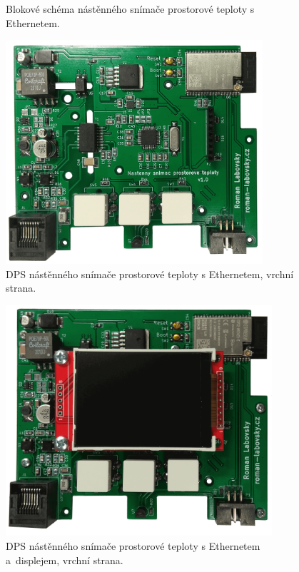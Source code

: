 \begin{figure}[H]
    \centering
    \def\svgwidth{\columnwidth}
    
    \caption[]{Blokové schéma nástěnného snímače prostorové teploty s Ethernetem.}
    \label{fig:blokove-schema-nastenny-snimac-teploty-ethernet}
\end{figure}

\begin{figure}[H]
    \centering
    \includegraphics[width=0.85\textwidth]{images/nastenny-snimac-prostorove-teploty-ethernet/dps-nastenny-snimac-prostorove-teploty-ethernet-vrchni-cast.png}
    \caption{DPS nástěnného snímače prostorové teploty s Ethernetem, vrchní strana.}
    \label{fig:dps-nastenny-snimac-prostorove-teploty-ethernet-vrchni-cast}
\end{figure}

\begin{figure}[H]
    \centering
    \includegraphics[width=0.88\textwidth]{images/nastenny-snimac-prostorove-teploty-ethernet/dps-nastenny-snimac-prostorove-teploty-ethernet-vrchni-cast-displej.png}
    \caption{DPS nástěnného snímače prostorové teploty s Ethernetem a~displejem, vrchní strana.}
    \label{fig:dps-nastenny-snimac-prostorove-teploty-ethernet-vrchni-cast-displej}
\end{figure}

